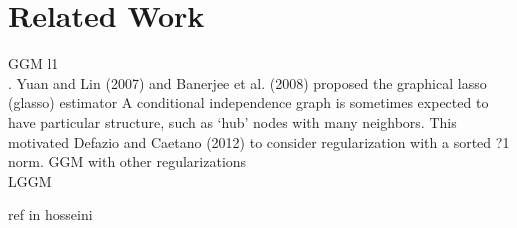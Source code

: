 \section{Related Work}
\label{related}
GGM l1\\
. Yuan and Lin (2007) and Banerjee et al. (2008) proposed the graphical lasso (glasso) estimator
A conditional independence graph is sometimes expected to have particular structure, such as ‘hub’ nodes with many neighbors. This motivated Defazio and Caetano (2012) to consider
regularization with a sorted ?1 norm.
GGM with other regularizations\\
LGGM\\
\citet{hosseini2016learning}
\citet{chandrasekaran2010}

ref in hosseini
\citet{tan2015cluster}
\citet{marlin2009sparse}
\citet{celik2014efficient}